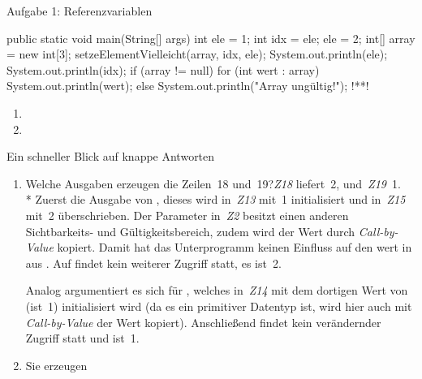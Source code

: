 {\begin{frame}[fragile]{Aufgabe 1: Referenzvariablen}
\begin{uncoverenv}
\begin{plainjava}[multicols=2,lineskip=-.5pt,prebreak={},numbers=left,numbersep=2pt]
{  public static void main(String[] args) {
    int ele = 1;
    int idx = ele;
    ele = 2;
    int[] array = new int[3];
    setzeElementVielleicht(array, idx, ele);
    System.out.println(ele);
    System.out.println(idx);
    if (array != null) {
      for (int wert : array) {
        System.out.println(wert);
      }
    } else {
      System.out.println("Array ungültig!");
    }
  }
}!**!
\end{plainjava}
\end{uncoverenv}
\vspace*{-4mm}\begin{enumerate}
    \item<4-> 
    \item<5-> 
\end{enumerate}
\end{frame}
{\def\n{\textcolor{codeouthl}{\textbackslash n}\,}
\def\Z#1;{\textit{Z#1}}
\begin{frame}{Ein schneller Blick auf knappe Antworten}
\begin{enumerate}[<+(1)->]
    \itemsep10pt
    \item {\intask Welche Ausgaben erzeugen die Zeilen~18 und~19?}\hfill\pause\Z18; liefert~2, und~\Z19;~1.\smallskip\\*\pause
    Zuerst die Ausgabe von , dieses wird in~\Z13; mit~1 initialisiert und in~\Z15; mit~2 überschrieben. \pause Der Parameter  in~\Z2; besitzt einen anderen Sichtbarkeits- und Gültigkeitsbereich, zudem wird der Wert durch \textit{Call-by-Value} kopiert. Damit hat das Unterprogramm keinen Einfluss auf den wert in  aus . \pause Auf  findet kein weiterer Zugriff statt, es ist~2.\smallskip\par\pause
    Analog argumentiert es sich für , welches in~\Z14; mit dem dortigen Wert von  (ist~1) initialisiert wird (da es ein primitiver Datentyp ist, wird hier auch mit \textit{Call-by-Value} der Wert kopiert). \pause Anschließend findet kein verändernder Zugriff statt und  ist~1.
    \item {}\par
    \pause Sie erzeugen \say{\T{0\n2\n0}} 
\end{enumerate}
\end{frame}

}}
